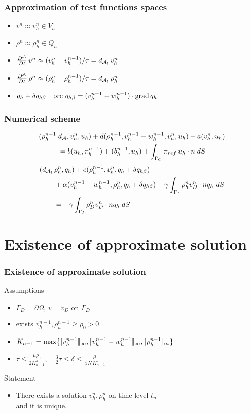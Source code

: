\documentclass{beamer}
\begin{document}
\frame
{
	\frametitle{Approximation of test functions spaces}
	\begin{itemize}
		\item $v^n \approx v_h^n \in V_h$
		\item $\rho^n \approx \rho_h^n \in Q_h$
		\item $\frac{D^\mathcal A}{Dt}\, v^n \approx (v_h^n-v_h^{n-1})/\tau = d_{\mathcal A_t\,} v_h^n$
		\item $\frac{D^\mathcal A}{Dt}\, \rho^n \approx	(\rho_h^n-\rho_h^{n-1})/\tau = d_{\mathcal A_t\,} \rho_h^n$
		\pause
		\newline
		\item $q_h+\delta q_{h\beta} \quad \mbox{pre }
		q_{h\beta}=(v_h^{n-1}-w_h^{n-1})\cdot\mbox{grad}\,q_h$
	\end{itemize}
}

\frame
{
	\frametitle{Numerical scheme}
	\[\begin{split}
		(\rho_h^{n-1}\; &d_{\mathcal A_t\,} v_h^n,u_h) + d(\rho_h^{n-1},v_h^{n-1}-w_h^{n-1},v_h^n,u_h) + a(v_h^n,u_h) \\
		&=b(u_h,\pi_h^{n-1}) + (b_h^{n-1},u_h) + \int_{\Gamma_O}{\pi_{ref}\,u_h \cdot
		n}\;dS
	\end{split}\]
	\pause 
	\[\begin{split}
		(d_{\mathcal A_t\,} &\rho_h^n,q_h) + e(\rho_h^{n-1},v_h^n,q_h+\delta q_{h\beta}) \\
		&+\alpha(v_h^{n-1}-w_h^{n-1},\rho_h^n,q_h+\delta q_{h\beta}) 
		- \gamma \int_{\Gamma_I}{\rho_h^n v_D^n \cdot nq_h}\;dS \\
		&= -\gamma \int_{\Gamma_I}{\rho_D^n v_D^n \cdot nq_h}\;dS
	\end{split}\]
}



\section{Existence of approximate solution}

\frame
{
	\frametitle{Existence of approximate solution}
	Assumptions
	\begin{itemize}
      	\item $\Gamma_D=\partial \Omega,\, v=v_D \mbox{ on } \Gamma_D$
		\item exists $v_h^{n-1}$,\,$\rho_h^{n-1} \ge \rho_0 > 0$ 
      	\item $K_{n-1} = \max \{ |\!| v_h^{n-1}|\!|_\infty,|\!|
      	v_h^{n-1}-w_h^{n-1}|\!|_\infty,|\!|\rho_h^{n-1}|\!|_\infty \}$
      	\item $\tau \le \frac{\mu\rho_0}{2K_{n-1}^4}, \quad \frac{3}{2}\tau \le
      	\delta \le \frac{\mu}{4\,N\,K_{n-1}^2}$
	\end{itemize}
	Statement
	\begin{itemize}
   		\item There exists a solution $v_h^n$,\,$\rho_h^n$ on time level $t_n$ \\ 
   		and it is unique.
	\end{itemize}
}
\end{document}
